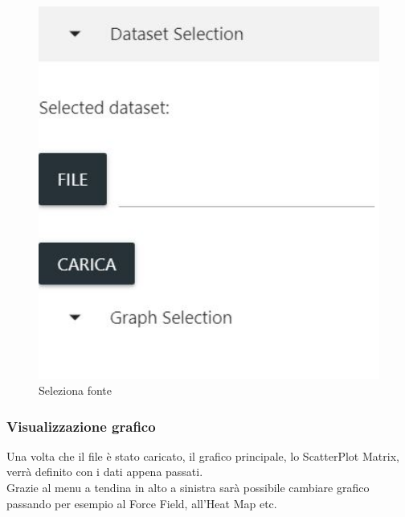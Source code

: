 \documentclass[../manuale_utente.tex]{subfiles}
\begin{document}
\begin{figure}[H]
	\centering
	\includegraphics[width=18cm]{img/seleziona_dataset.jpg}
	\caption{Seleziona fonte}
\end{figure}

\subsubsection{Visualizzazione grafico}
    \label{subsub:vis_graf}
Una volta che il file è stato caricato, il grafico principale, lo ScatterPlot Matrix, verrà definito con i dati appena passati. \\
Grazie al menu a tendina in alto a sinistra sarà possibile cambiare grafico passando per esempio al Force Field, all’Heat Map etc.
\end{document}
